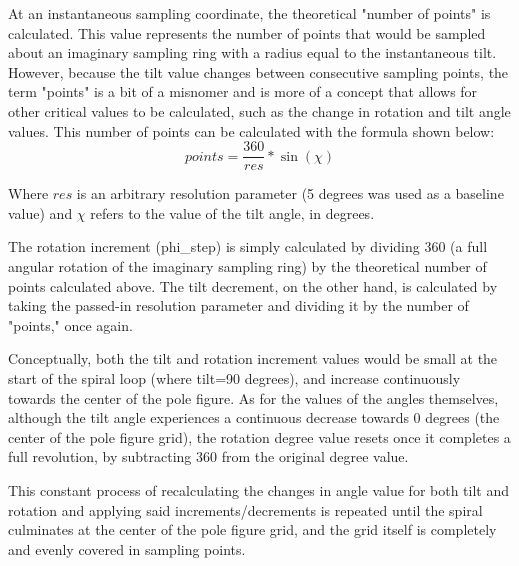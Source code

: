 \documentclass{article}
\begin{document}
At an instantaneous sampling coordinate, the theoretical "number of points" is calculated. This value represents the number of points that would be sampled about an imaginary sampling ring with a radius equal to the instantaneous tilt. However, because the tilt value changes between consecutive sampling points, the term "points" is a bit of a misnomer and is more of a concept that allows for other critical values to be calculated, such as the change in rotation and tilt angle values. This number of points can be calculated with the formula shown below:
\begin{equation}
    points = \frac{360}{res} * \sin(\chi)
\end{equation}

Where $res$ is an arbitrary resolution parameter (5 degrees was used as a baseline value) and $\chi$ refers to the value of the tilt angle, in degrees.

The rotation increment (phi\_step) is simply calculated by dividing 360 (a full angular rotation of the imaginary sampling ring) by the theoretical number of points calculated above. The tilt decrement, on the other hand, is calculated by taking the passed-in resolution parameter and dividing it by the number of "points," once again. 

Conceptually, both the tilt and rotation increment values would be small at the start of the spiral loop (where tilt=90 degrees), and increase continuously towards the center of the pole figure. As for the values of the angles themselves, although the tilt angle experiences a continuous decrease towards 0 degrees (the center of the pole figure grid), the rotation degree value resets once it completes a full revolution, by subtracting 360 from the original degree value. 

This constant process of recalculating the changes in angle value for both tilt and rotation and applying said increments/decrements is repeated until the spiral culminates at the center of the pole figure grid, and the grid itself is completely and evenly covered in sampling points.



\end{document}
